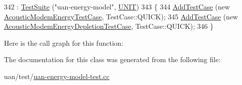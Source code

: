\begin{DoxyCode}
342   : \hyperlink{classns3_1_1TestSuite_a904b0c40583b744d30908aeb94636d1a}{TestSuite} (\textcolor{stringliteral}{"uan-energy-model"}, \hyperlink{classns3_1_1TestSuite_a1ebfcab34ec8161e085e8e3a1855eae0a3885375a3787abf60431f8454b3cadbd}{UNIT})
343 \{
344   \hyperlink{classns3_1_1TestCase_a3718088e3eefd5d6454569d2e0ddd835}{AddTestCase} (\textcolor{keyword}{new} \hyperlink{classAcousticModemEnergyTestCase}{AcousticModemEnergyTestCase}, TestCase::QUICK);
345   \hyperlink{classns3_1_1TestCase_a3718088e3eefd5d6454569d2e0ddd835}{AddTestCase} (\textcolor{keyword}{new} \hyperlink{classAcousticModemEnergyDepletionTestCase}{AcousticModemEnergyDepletionTestCase}, 
      TestCase::QUICK);
346 \}
\end{DoxyCode}


Here is the call graph for this function\+:




The documentation for this class was generated from the following file\+:\begin{DoxyCompactItemize}
\item 
uan/test/\hyperlink{uan-energy-model-test_8cc}{uan-\/energy-\/model-\/test.\+cc}\end{DoxyCompactItemize}
